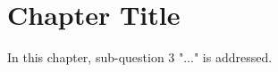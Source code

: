\chapter{Chapter Title}
\label{ch5: third-core-chapter}
\minitoc

In this chapter, sub-question 3 "..." is addressed.

